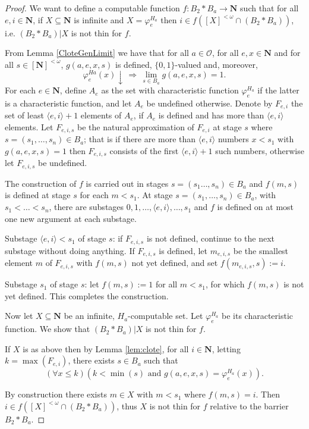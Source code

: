 \documentclass{amsart}
\theoremstyle{plain}
\theoremstyle{plain}
\newcommand{\om}{\omega}
\newcommand\Nat{\mathbf{N}}
\begin{document}
\begin{proof}
We want to define a computable function $f:B_2 * B_a \to \Nat$ such that for all $e,i\in\Nat$, if $X\subseteq\Nat$ is infinite and $X = \varphi_e^{H_a}$ then $i \in f([X]^{<\om} \cap (B_2*B_a))$, i.e. $(B_2*B_a)\vert X$ is not thin for $f$.

From Lemma \ref{CloteGenLimit} we have that for all $a \in \mathcal{O}$, for all 
$e, x \in \Nat$ and for all $s \in [\Nat]^{<\om}$, $g(a,e,x,s)$ is defined, $\{0,1\}$-valued and, moreover,
$$\varphi_e^{Ha}(x)\downarrow \,\Longrightarrow\, \lim_{s\in B_a} g(a,e,x,s)=1.$$
For each $e\in\Nat$, define $A_e$ as the set with characteristic function $\varphi_e^{H_a}$ if the latter is a characteristic function, and let $A_e$ be undefined otherwise. 
Denote by $F_{e,i}$ the set of least $\langle e,i\rangle+1$ elements of $A_e$, if $A_e$ is defined and has more than $\langle e,i\rangle$ elements. 
Let $F_{e,i,s}$ be the natural approximation of $F_{e,i}$ at stage $s$ where $s=(s_1, \ldots ,s_n)\in B_a$; that is if there are more than $\langle e,i\rangle $ numbers $x<s_1$ with $g(a,e,x,s) = 1$ then 
$F_{e,i,s}$ consists of the first $\langle e,i\rangle +1$ such numbers, otherwise let  $F_{e,i,s}$ be undefined.\smallskip

The construction of $f$ is carried out in stages $s=(s_1 \ldots ,s_n)\in B_a$ and $f(m,s)$ is defined at stage $s$ for each $m<s_1$. At stage $s=(s_1, \ldots, s_n) \in B_a$, with $s_1<\ldots <s_n$, there are substages $0,1,\ldots, \langle e,i\rangle, \ldots, s_1$ and $f$ is defined on at most one new argument at each substage.

\medskip
Substage $\langle e,i \rangle < s_1$ of stage $s$: if $F_{e,i,s}$ is not defined, continue to the next substage without doing anything. 
If $F_{e,i,s}$  is defined, let $m_{e,i,s}$ be the smallest element $m$ of $F_{e,i,s}$ with $f(m, s)$ not yet defined, and set $f(m_{e,i,s}, s):= i$.\smallskip

Substage $s_1$ of stage $s$: let $f(m,s):=1$ for all $m<s_1$, for which $f(m,s)$ is not yet defined. 
This completes the construction. 

\medskip
Now let $X\subseteq\Nat$ be an infinite, $H_a$-computable set. Let $\varphi_e^{H_a}$ be its characteristic function.
We show that $(B_2*B_a)\vert X$ is not thin for $f$.

If $X$ is as above then by Lemma \ref{lem:clote}, for all $i\in\Nat$, letting  $k=\max(F_{e,i})$,
there exists $ s \in B_a$ such that
$$(\forall x\leq k)(k < \min(s) \text{ and } g(a,e,x,s) = \varphi_e^{H_a}(x)).$$

By construction there exists $m\in X$ with $m<s_1$ where $f(m,s) = i$. Then $i \in f([X]^{<\om} \cap (B_2*B_a))$, thus $X $ is not thin for $f$ relative to the barrier $B_2*B_a$.
  \end{proof}
\end{document}
